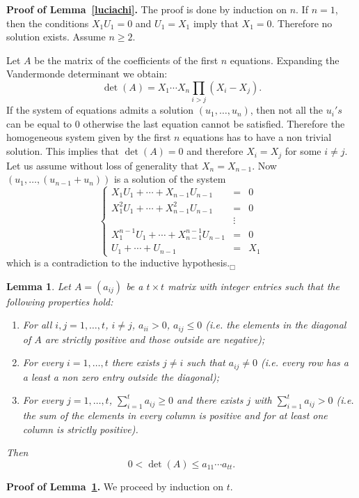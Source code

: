 \documentclass[a4paper,twoside]{article}
\newtheorem{Lemma}{Lemma}[section]
\begin{document}
\noindent\textbf{Proof of Lemma~\ref{luciachi}.}
The proof is done by induction on $n$. If $n=1$, then
the conditions $X_1U_1=0$ and $U_1=X_1$ imply
that $X_1=0$. Therefore no solution exists.
Assume $n\geq2$.

Let $A$ be the matrix of the coefficients of the first $n$
equations. Expanding the Vandermonde determinant we obtain:
$$\det(A)=X_1\cdots X_n\prod_{i>j}(X_i-X_j).$$
If the system of equations admits a solution $(u_1,\ldots,u_n)$,
then not all the $u_i's$ can be equal to $0$ otherwise the last
equation cannot be satisfied. Therefore the homogeneous system
given by the first $n$ equations has to have a non trivial
solution. This implies that $\det(A)=0$ and therefore $X_i= X_j$
for some $i\neq j$. Let us assume without loss of generality that
$X_n=X_{n-1}$. Now $(u_1,\ldots,(u_{n-1}+u_n))$ is a solution of
the system
$$
\left\{\begin{array}{rcl}
X_1U_1+\cdots+X_{n-1}U_{n-1} & = & 0\\
X_1^2U_1+\cdots+X_{n-1}^2U_{n-1} & = & 0\\
 &\vdots & \\
X_1^{n-1}U_1+\cdots+X_{n-1}^{n-1}U_{n-1} & = & 0\\
U_1+\cdots+U_{n-1} &=&X_1
\end{array}\right.$$
which is a contradiction to the inductive hypothesis.\hfill$_\Box$\medskip


\begin{Lemma} \label{topo} Let $A=(a_{ij})$ be a $t\times t$ matrix with integer
entries such that the following properties hold:
\begin{enumerate}
\item For all $i,j=1,\ldots,t$, $i\neq j$, $a_{ii}>0$, $a_{ij}\leq
0$ (i.e. the elements in the diagonal of $A$ are strictly positive
and those outside are negative); \item For every $i=1,\ldots,t$
there exists $j\neq i$ such that $a_{ij}\neq0$ (i.e. every row has
a a least a non zero entry outside the diagonal); \item For every
$j=1,\ldots,t$, $\displaystyle{\sum_{i=1}^t a_{ij}}\geq0$ and
there exists $j$ with $\displaystyle{\sum_{i=1}^t a_{ij}}>0$ (i.e.
the sum of the elements in every column is positive and for at
least one column is strictly positive).
\end{enumerate}
Then
$$0<\det(A)\leq a_{11}\cdots a_{tt}.$$
\end{Lemma}

\noindent\textbf{Proof of Lemma~\ref{topo}.} We proceed by induction on $t$.
\end{document}
